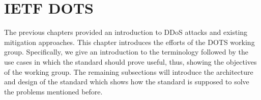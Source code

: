 %


\section{IETF DOTS}
The previous chapters provided an introduction to DDoS attacks and existing mitigation approaches. This chapter introduces the efforts of the DOTS working group. Specifically, we give an introduction to the terminology followed by the use cases in which the standard should prove useful, thus, showing the objectives of the working group. The remaining subsections will introduce the architecture and design of the standard which shows how the standard is supposed to solve the problems mentioned before.

